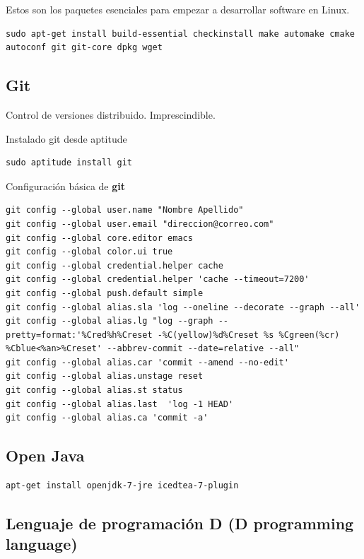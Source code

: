 \documentclass[12pt,spanish,]{scrartcl}
\begin{document}
Estos son los paquetes esenciales para empezar a desarrollar software en
Linux.

\begin{verbatim}
sudo apt-get install build-essential checkinstall make automake cmake autoconf git git-core dpkg wget
\end{verbatim}

\subsection{Git}\label{git}

Control de versiones distribuido. Imprescindible.

Instalado git desde aptitude

\begin{verbatim}
sudo aptitude install git
\end{verbatim}

Configuración básica de \textbf{git}

\begin{verbatim}
git config --global user.name "Nombre Apellido"
git config --global user.email "direccion@correo.com"
git config --global core.editor emacs
git config --global color.ui true
git config --global credential.helper cache
git config --global credential.helper 'cache --timeout=7200'
git config --global push.default simple
git config --global alias.sla 'log --oneline --decorate --graph --all'
git config --global alias.lg "log --graph --pretty=format:'%Cred%h%Creset -%C(yellow)%d%Creset %s %Cgreen(%cr) %Cblue<%an>%Creset' --abbrev-commit --date=relative --all"
git config --global alias.car 'commit --amend --no-edit'
git config --global alias.unstage reset
git config --global alias.st status
git config --global alias.last  'log -1 HEAD'
git config --global alias.ca 'commit -a'
\end{verbatim}

\subsection{Open Java}\label{open-java}

\begin{verbatim}
apt-get install openjdk-7-jre icedtea-7-plugin
\end{verbatim}

\subsection{Lenguaje de programación D (D programming
language)}\label{lenguaje-de-programaciuxf3n-d-d-programming-language}
\end{document}
